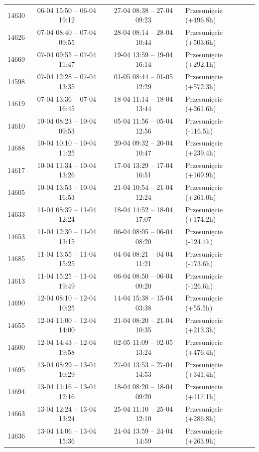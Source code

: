 \begin{table}[htbp]
\begin{tabular}{|r|c|c|l|}
14630 & 06-04 15:50 -- 06-04 19:12 & 27-04 08:38 -- 27-04 09:23 & Przesunięcie (+496.8h) \\ 
14626 & 07-04 08:40 -- 07-04 09:55 & 28-04 08:14 -- 28-04 10:44 & Przesunięcie (+503.6h) \\ 
14669 & 07-04 09:55 -- 07-04 11:47 & 19-04 13:59 -- 19-04 16:14 & Przesunięcie (+292.1h) \\ 
14598 & 07-04 12:28 -- 07-04 13:35 & 01-05 08:44 -- 01-05 12:29 & Przesunięcie (+572.3h) \\ 
14619 & 07-04 13:36 -- 07-04 16:45 & 18-04 11:14 -- 18-04 13:44 & Przesunięcie (+261.6h) \\ 
14610 & 10-04 08:23 -- 10-04 09:53 & 05-04 11:56 -- 05-04 12:56 & Przesunięcie (-116.5h) \\ 
14688 & 10-04 10:10 -- 10-04 11:25 & 20-04 09:32 -- 20-04 10:47 & Przesunięcie (+239.4h) \\ 
14617 & 10-04 11:34 -- 10-04 13:26 & 17-04 13:29 -- 17-04 16:51 & Przesunięcie (+169.9h) \\ 
14605 & 10-04 13:53 -- 10-04 16:53 & 21-04 10:54 -- 21-04 12:24 & Przesunięcie (+261.0h) \\ 
14633 & 11-04 08:39 -- 11-04 12:24 & 18-04 14:52 -- 18-04 17:07 & Przesunięcie (+174.2h) \\ 
14653 & 11-04 12:30 -- 11-04 13:15 & 06-04 08:05 -- 06-04 08:20 & Przesunięcie (-124.4h) \\ 
14685 & 11-04 13:55 -- 11-04 15:25 & 04-04 08:21 -- 04-04 11:21 & Przesunięcie (-173.6h) \\ 
14613 & 11-04 15:25 -- 11-04 19:49 & 06-04 08:50 -- 06-04 09:20 & Przesunięcie (-126.6h) \\ 
14690 & 12-04 08:10 -- 12-04 10:25 & 14-04 15:38 -- 15-04 03:38 & Przesunięcie (+55.5h) \\ 
14655 & 12-04 11:00 -- 12-04 14:00 & 21-04 08:20 -- 21-04 10:35 & Przesunięcie (+213.3h) \\ 
14600 & 12-04 14:43 -- 12-04 19:58 & 02-05 11:09 -- 02-05 13:24 & Przesunięcie (+476.4h) \\ 
14695 & 13-04 08:29 -- 13-04 10:29 & 27-04 13:53 -- 27-04 14:53 & Przesunięcie (+341.4h) \\ 
14694 & 13-04 11:16 -- 13-04 12:16 & 18-04 08:20 -- 18-04 09:20 & Przesunięcie (+117.1h) \\ 
14663 & 13-04 12:24 -- 13-04 13:24 & 25-04 11:10 -- 25-04 12:10 & Przesunięcie (+286.8h) \\ 
14636 & 13-04 14:06 -- 13-04 15:36 & 24-04 13:59 -- 24-04 14:59 & Przesunięcie (+263.9h) \\ 

\end{tabular}
\end{table}
